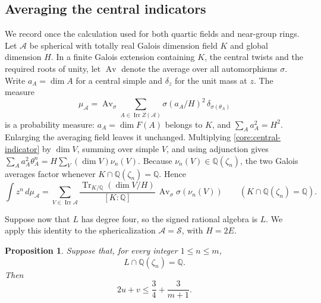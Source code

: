 \documentclass[11pt,a4paper]{article}
\newtheorem{proposition}[theorem]{Proposition}
\theoremstyle{definition}\newtheorem{definition}[theorem]{Definition}
\theoremstyle{remark}\newtheorem{remark}[theorem]{Remark}
\DeclareMathOperator{\Irr}{Irr}
\DeclareMathOperator{\Tr}{Tr}
\newcommand{\Q}{\mathbb Q}
\numberwithin{equation}{section}
\begin{document}
\subsection{Averaging the central indicators}

We record once the calculation used for both quartic fields and
near-group rings. Let $\mathcal A$ be spherical with totally real
Galois dimension field $K$ and global dimension $H$.
In a finite Galois extension containing $K$, the central twists
and the required roots of unity, let $\operatorname{Av}$ denote the
average over all automorphisms $\sigma$. Write $a_A=\dim A$ for a
central simple and $\delta_z$ for the unit mass at $z$. The measure
\[
 \mu_{\mathcal A}
 =\operatorname{Av}_\sigma\sum_{A\in\Irr Z(\mathcal A)}
     \sigma(a_A/H)^2\,\delta_{\sigma(\theta_A)}
\]
is a probability measure: $a_A=\dim F(A)$ belongs to $K$, and
$\sum_A a_A^2=H^2$. Enlarging the averaging field leaves it unchanged.
Multiplying \eqref{core:central-indicator} by $\dim V$, summing over
simple $V$, and using adjunction gives
$\sum_Aa_A^2\theta_A^n=H\sum_V(\dim V)\nu_n(V)$.
Because $\nu_n(V)\in\Q(\zeta_n)$, the two Galois averages factor
whenever $K\cap\Q(\zeta_n)=\Q$. Hence
\begin{equation}\label{core:eq:averaged-indicators}
 \int z^n\,d\mu_{\mathcal A}
 =\sum_{V\in\Irr\mathcal A}
   \frac{\Tr_{K/\Q}(\dim V/H)}{[K:\Q]}\,
   \operatorname{Av}_\sigma\sigma(\nu_n(V))
 \qquad (K\cap\Q(\zeta_n)=\Q).
\end{equation}

Suppose now that $L$ has degree four, so the signed rational algebra
is $L$. We apply this identity to the sphericalization
$\mathcal A=\mathcal S$, with $H=2E$.

\begin{proposition}\label{core:prop:quartic-individual-disjointness}
Suppose that, for every integer $1\le n\le m$,
\begin{equation}\label{core:eq:quartic-individual-intersection}
 L\cap\Q(\zeta_n)=\Q.
\end{equation}
Then
\begin{equation}\label{core:eq:quartic-averaged-bound}
 2u+v\le\frac34+\frac3{m+1}.
\end{equation}
\end{proposition}
\end{document}
